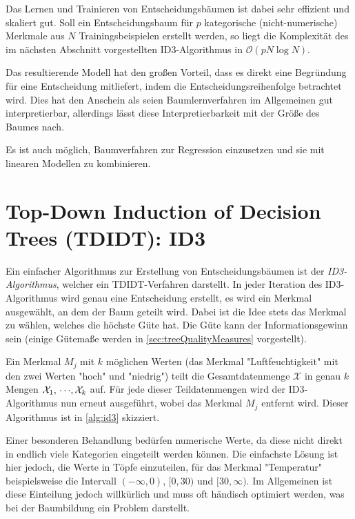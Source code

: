 	Das Lernen und Trainieren von Entscheidungsbäumen ist dabei sehr effizient und skaliert gut. Soll ein Entscheidungsbaum für \(p\) kategorische (nicht-numerische) Merkmale aus \(N\) Trainingsbeispielen erstellt werden, so liegt die Komplexität des im nächsten Abschnitt vorgestellten ID3-Algorithmus in \( \mathcal{O}(p N \log N) \).

	Das resultierende Modell hat den großen Vorteil, dass es direkt eine Begründung für eine Entscheidung mitliefert, indem die Entscheidungsreihenfolge betrachtet wird. Dies hat den Anschein als seien Baumlernverfahren im Allgemeinen gut interpretierbar, allerdings lässt diese Interpretierbarkeit mit der Größe des Baumes nach.

	Es ist auch möglich, Baumverfahren zur Regression einzusetzen und sie \bspw mit linearen Modellen zu kombinieren.

	\section{Top-Down Induction of Decision Trees (TDIDT): ID3}
		Ein einfacher Algorithmus zur Erstellung von Entscheidungsbäumen ist der \emph{ID3-Algorithmus}, welcher ein TDIDT-Verfahren darstellt. In jeder Iteration des ID3-Algorithmus wird genau eine Entscheidung erstellt, \dh es wird ein Merkmal ausgewählt, an dem der Baum geteilt wird. Dabei ist die Idee stets das Merkmal zu wählen, welches die höchste Güte hat. Die Güte kann \bspw der Informationsgewinn sein (einige Gütemaße werden in \autoref{sec:treeQualityMeasures} vorgestellt).

		Ein Merkmal \(M_j\) mit \(k\) möglichen Werten (\bspw das Merkmal "Luftfeuchtigkeit" mit den zwei Werten "hoch" und "niedrig") teilt die Gesamtdatenmenge \( \mathcal{X} \) in genau \(k\) Mengen \( \mathcal{X}_1,\,\cdots\!,\mathcal{X}_k \) auf. Für jede dieser Teildatenmengen wird der ID3-Algorithmus nun erneut ausgeführt, wobei das Merkmal \(M_j\) entfernt wird. Dieser Algorithmus ist in \autoref{alg:id3} skizziert.

		Einer besonderen Behandlung bedürfen numerische Werte, da diese nicht direkt in endlich viele Kategorien eingeteilt werden können. Die einfachste Lösung ist hier jedoch, die Werte in Töpfe einzuteilen, für das Merkmal "Temperatur" beispielsweise die Intervall \( (-\infty, 0) \), \( [0, 30) \) und \( [30, \infty) \). Im Allgemeinen ist diese Einteilung jedoch willkürlich und muss oft händisch optimiert werden, was bei der Baumbildung ein Problem darstellt.

